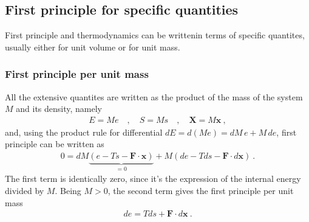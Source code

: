 \documentclass[letterpaper,10pt,english]{jupyterBook}
\begin{document}
\subsection{First principle for specific quantities}
\label{\detokenize{ch/potentials:first-principle-for-specific-quantities}}
\sphinxAtStartPar
First principle and thermodynamics can be writtenin terms of specific quantites, usually either for unit volume or for unit mass.


\subsubsection{First principle per unit mass}
\label{\detokenize{ch/potentials:first-principle-per-unit-mass}}
\sphinxAtStartPar
All the extensive quantites are written as the product of the mass of the system \(M\) and its density, namely
\begin{equation*}
\begin{split}E = M  e \quad , \quad S = M  s \quad , \quad \mathbf{X} = M \mathbf{x} \ ,\end{split}
\end{equation*}
\sphinxAtStartPar
and, using the product rule for differential \(d E = d (M e) = dM \, e + M \, de\), first principle can be written as
\begin{equation*}
\begin{split}0 = d M \underbrace{\left( e - T s - \mathbf{F} \cdot \mathbf{x} \right)}_{= 0} + M \left( d e - T ds - \mathbf{F} \cdot d \mathbf{x} \right) \ .\end{split}
\end{equation*}
\sphinxAtStartPar
The first term is identically zero, since it’s the expression of the internal energy divided by \(M\). Being \(M > 0\), the second term gives the first principle per unit mass
\begin{equation*}
\begin{split}d e = T ds + \mathbf{F} \cdot d \mathbf{x} \ .\end{split}
\end{equation*}
\end{document}
